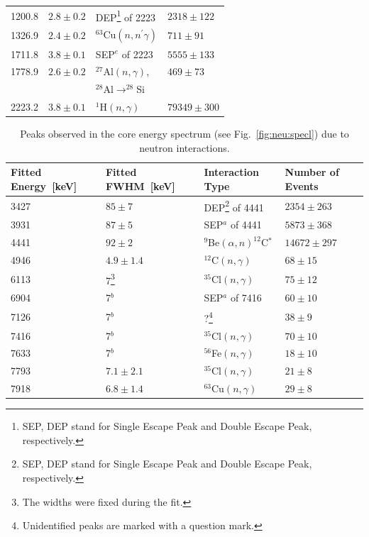 \begin{table}[tbhp]
\begin{minipage}{\linewidth}
\begin{tabular*}{\textwidth}{llll}
      1200.8 & $2.8 \pm 0.2$ & DEP\footnote{SEP, DEP stand for Single
        Escape Peak and Double Escape Peak, respectively.} of 2223
      & $2318 \pm 122$ \\
      1326.9 & $2.4 \pm 0.2$ & $^{63}$Cu$(n,n^\prime\gamma)$   & $711 
\pm 91$  \\
      1711.8 & $3.8 \pm 0.1$ & SEP$^e$ of 2223 & $5555 \pm 133$ \\
      1778.9 & $2.6 \pm 0.2$ & $^{27}$Al$(n,\gamma)$, & $469  \pm 73$
\\
      &  & $^{28}$Al$\rightarrow^{28}$Si &  \\
      2223.2 & $3.8 \pm 0.1$ & $^{1}$H$(n,\gamma)$ & $79349 \pm 300$\\
    \end{tabular*}
  \end{minipage}
\end{table}

\begin{table}[tbhp]
  \caption{Peaks observed in the core energy spectrum (see
Fig.~\ref{fig:neu:specl})
    due to neutron interactions.} 
  \label{tab:neu:peak2}\centering
  \begin{minipage}{\linewidth}\centering
    \begin{tabular*}{\textwidth}{llll} \hline\noalign{\smallskip}
      Fitted Energy~[keV]& Fitted FWHM~[keV]& Interaction Type& Number of Events\\\hline
 3427 & $85 \pm 7$
      & DEP\footnote{SEP, DEP stand for Single Escape Peak and Double
        Escape Peak, respectively.} of 4441 & $2354 \pm 263$ \\
      3931 & $87 \pm 5$  & SEP$^a$ of 4441 & $5873 \pm 368$ \\
      4441 & $92 \pm 2$  & $^{9}$Be$(\alpha,n)^{12}$C$^{*}$ & $14672
\pm 297$ \\
      4946 & $4.9\pm1.4$ & $^{12}$C$(n,\gamma)$            & $68 \pm
15$     \\
      6113 & 7\footnote{The widths were fixed during the fit.}
      & $^{35}$Cl$(n,\gamma)$ & $75 \pm 12$ \\
      6904 & 7$^b$      & SEP$^a$ of 7416            & $60 \pm 10$ \\
      7126 & 7$^b$ & ?\footnote{Unidentified peaks are marked with
        a question mark.} & $38 \pm  9$ \\
      7416 & 7$^b$       & $^{35}$Cl$(n,\gamma)$ & $70 \pm 10$ \\
      7633 & 7$^b$       & $^{56}$Fe$(n,\gamma)$ & $18 \pm 10$ \\
      7793 & $7.1\pm2.1$ & $^{35}$Cl$(n,\gamma)$ & $21 \pm  8$ \\
      7918 & $6.8\pm1.4$ & $^{63}$Cu$(n,\gamma)$ & $29 \pm  8$ \\
  \end{tabular*}
  \end{minipage}
\end{table}

